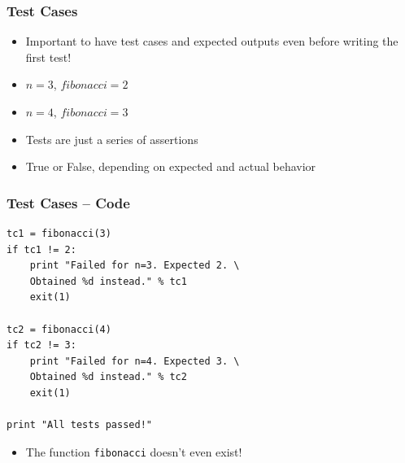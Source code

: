 \documentclass[12pt,presentation]{beamer}
\begin{document}
\begin{frame}[fragile]
  \frametitle{Test Cases}
  \begin{itemize}
  \item Important to have test cases and expected outputs even before
    writing the first test!
  \item $n=3$, $fibonacci=2$
  \item $n=4$, $fibonacci=3$
  \item Tests are just a series of assertions
  \item True or False, depending on expected and actual behavior
  \end{itemize}
\end{frame}

\begin{frame}[fragile]
  \frametitle{Test Cases -- Code}
\begin{lstlisting}
tc1 = fibonacci(3)
if tc1 != 2:
    print "Failed for n=3. Expected 2. \
    Obtained %d instead." % tc1
    exit(1)

tc2 = fibonacci(4)
if tc2 != 3:
    print "Failed for n=4. Expected 3. \
    Obtained %d instead." % tc2
    exit(1)

print "All tests passed!"
\end{lstlisting}
\begin{itemize}
\item The function \texttt{fibonacci} doesn't even exist!
\end{itemize}
\end{frame}
\end{document}
